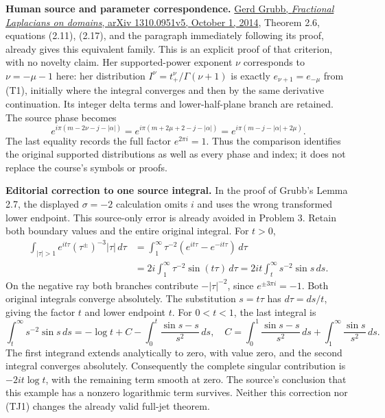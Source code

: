 \documentclass[
  11pt,
]{article}
\begin{document}
\textbf{Human source and parameter correspondence.}
\href{https://arxiv.org/abs/1310.0951v5}{Gerd Grubb, \emph{Fractional
Laplacians on domains}, arXiv 1310.0951v5, October 1, 2014}, Theorem
2.6, equations (2.11), (2.17), and the paragraph immediately following
its proof, already gives this equivalent family. This is an explicit
proof of that criterion, with no novelty claim. Her supported-power
exponent \(\nu\) corresponds to \(\nu=-\mu-1\) here: her distribution
\(I^\nu=t_+^\nu/\Gamma(\nu+1)\) is exactly \(e_{\nu+1}=e_{-\mu}\) from
(T1), initially where the integral converges and then by the same
derivative continuation. Its integer delta terms and lower-half-plane
branch are retained. The source phase becomes \[
 e^{i\pi(m-2\nu-j-|\alpha|)}
 =e^{i\pi(m+2\mu+2-j-|\alpha|)}
 =e^{i\pi(m-j-|\alpha|+2\mu)}.
 \tag{TJ6}
\] The last equality records the full factor \(e^{2\pi i}=1\). Thus the
comparison identifies the original supported distributions as well as
every phase and index; it does not replace the course's symbols or
proofs.

\textbf{Editorial correction to one source integral.} In the proof of
Grubb's Lemma 2.7, the displayed \(\sigma=-2\) calculation omits \(i\)
and uses the wrong transformed lower endpoint. This source-only error is
already avoided in Problem 3. Retain both boundary values and the entire
original integral. For \(t>0\), \[
 \begin{split}
 \int_{|\tau|>1}e^{it\tau}(\tau^\pm)^{-3}|\tau|\,d\tau
 &=\int_1^\infty\tau^{-2}(e^{it\tau}-e^{-it\tau})\,d\tau\\
 &=2i\int_1^\infty\tau^{-2}\sin(t\tau)\,d\tau
 =2it\int_t^\infty s^{-2}\sin s\,ds.
 \end{split}
 \tag{TJ7}
\] On the negative ray both branches contribute \(-|\tau|^{-2}\), since
\(e^{\pm3\pi i}=-1\). Both original integrals converge absolutely. The
substitution \(s=t\tau\) has \(d\tau=ds/t\), giving the factor \(t\) and
lower endpoint \(t\). For \(0<t<1\), the last integral is \[
 \int_t^\infty s^{-2}\sin s\,ds
 =-\log t+C-\int_0^t\frac{\sin s-s}{s^2}\,ds,
 \quad C=\int_0^1\frac{\sin s-s}{s^2}\,ds+
             \int_1^\infty\frac{\sin s}{s^2}\,ds.
 \tag{TJ8}
\] The first integrand extends analytically to zero, with value zero,
and the second integral converges absolutely. Consequently the complete
singular contribution is \(-2it\log t\), with the remaining term smooth
at zero. The source's conclusion that this example has a nonzero
logarithmic term survives. Neither this correction nor (TJ1) changes the
already valid full-jet theorem.
\end{document}
